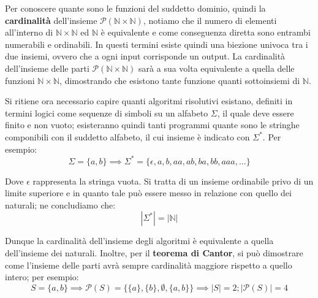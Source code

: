 \noindent Per conoscere quante sono le funzioni del suddetto dominio, quindi la \textbf{cardinalità} dell'insieme $\mathcal{P}(\mathbb{N}\times
\mathbb{N})$, notiamo che il numero di elementi all'interno di $\mathbb{N}\times\mathbb{N}$ ed $\mathbb{N}$ è equivalente e come conseguenza diretta
sono entrambi numerabili e ordinabili. In questi termini esiste quindi una biezione univoca tra i due insiemi, ovvero che a ogni input corrisponde un
output. La cardinalità dell'insieme delle parti $\mathcal{P}(\mathbb{N}\times \mathbb{N})$ sarà a sua volta equivalente a quella delle funzioni
$\mathbb{N}\times\mathbb{N}$, dimostrando che esistono tante funzione quanti sottoinsiemi di $\mathbb{N}$.\par
Si ritiene ora necessario capire quanti algoritmi risolutivi esistano, definiti in termini logici come sequenze di simboli su un alfabeto $\Sigma$, il
quale deve essere finito e non vuoto; esisteranno quindi tanti programmi quante sono le stringhe componibili con il suddetto alfabeto, il cui insieme
è indicato con $\Sigma^*$. Per esempio: \[
	\Sigma = \{a, b\} \implies \Sigma^* = \{\epsilon, a, b, aa, ab, ba, bb, aaa, ...\}
\]

\noindent Dove $\epsilon$ rappresenta la stringa vuota. Si tratta di un insieme ordinabile privo di un limite superiore e in quanto tale può essere
messo in relazione con quello dei naturali; ne concludiamo che: \[
	|\Sigma^*| = |\mathbb{N}|
\]

\noindent Dunque la cardinalità dell'insieme degli algoritmi è equivalente a quella dell'insieme dei naturali. Inoltre, per il \textbf{teorema di
Cantor}, si può dimostrare come l'insieme delle parti avrà sempre cardinalità maggiore rispetto a quello intero; per esempio: \[
	S = \{a, b\} \implies \mathcal{P}(S) = \{\{a\}, \{b\}, \emptyset, \{a,b\}\} \implies |S| = 2; |\mathcal{P}(S)| = 4
\]